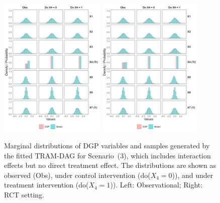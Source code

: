 \begin{figure}[htbp]
\centering
\includegraphics[width=0.45\textwidth]{img/results/observ_scenario3_sampling_distributions_vertical.png}
\includegraphics[width=0.45\textwidth]{img/results/rct_scenario3_sampling_distributions_vertical.png}
\caption{Marginal distributions of DGP variables and samples generated by the fitted TRAM-DAG for Scenario~(3), which includes interaction effects but no direct treatment effect. The distributions are shown as observed (Obs), under control intervention (do($X_4 = 0$)), and under treatment intervention (do($X_4 = 1$)). Left: Observational; Right: RCT setting.}
\label{fig:scenario3_sampling_distributions_vertical}
\end{figure}

